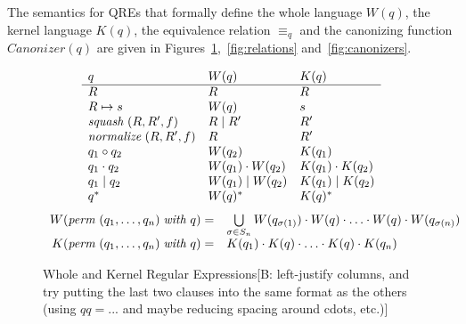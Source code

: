 \documentclass{svproc}
\newcommand{\FINISH}[3]{\ifdraft\textcolor{#1}{[#2: #3]}\fi}
\newcommand{\bcp}[1]{\FINISH{dkred}{B}{#1}}
\newcommand{\squash}[3]{\ensuremath{\mathit{squash} \; (#1, #2, #3)}}
\newcommand{\perm}[2]{\ensuremath{\mathit{perm}\; (#1)\; \mathit{with}\; #2}}
\newcommand{\normalize}[3]{\ensuremath{\mathit{normalize} \; (#1, #2, #3)}}
\newcommand{\sep}{\ensuremath{\; | \;}}
\newcommand{\canonizer}{\ensuremath{\mathit{Canonizer}}}
\newcommand{\eqrel}[1]{\ensuremath{\equiv_{#1}}}
\begin{document}
The semantics for QREs that formally define the whole language $W(q)$, the
kernel language $K(q)$, the equivalence relation $\eqrel{q}$ and the
canonizing function $\canonizer(q)$ are given in
Figures~\ref{fig:wk},~\ref{fig:relations} and~\ref{fig:canonizers}.
\begin{figure}[t]
  \centering
  \[
    \begin{array}{l@{\quad}l@{\quad}l}
      
      q & W(q) & K(q) \\ \hline
      R & R & R \\
      R \mapsto s & W(q) & s \\
      \squash{R}{R'}{f} & R \sep R' & R' \\
      \normalize{R}{R'}{f} & R & R' \\
      q_1 \circ  q_2 & W(q_2) & K(q_1) \\
      q_1 \cdot q_2 & W(q_1) \cdot W(q_2) & K(q_1) \cdot K(q_2) \\
      q_1 \sep q_2 & W(q_1) \sep W(q_2) & K(q_1) \sep K(q_2) \\
      q^* & W(q)^* & K(q)^* \\
    \end{array}
  \]
  \[
    \begin{array}{r@{\quad}l}
      W( \perm{q_1, \ldots, q_n}{q} ) = &
                                          \bigcup \limits_{\sigma \in S_n} W(q_{\sigma(1)}) \cdot W(q) \cdot \ldots \cdot
                                          W(q) \cdot W(q_{\sigma(n)})
      \\
      K( \perm{q_1, \ldots, q_n}{q} ) = &
                                          K(q_1) \cdot K(q) \cdot \ldots \cdot K(q) \cdot K(q_n) 
    \end{array}
  \]
  \caption{Whole and Kernel Regular Expressions\bcp{left-justify columns,
      and try putting the last two clauses into the same format as the
      others (using $\mathit{qq} = ...$ and maybe reducing spacing around
      cdots, etc.)}}
  \label{fig:wk}
\end{figure}
\end{document}
